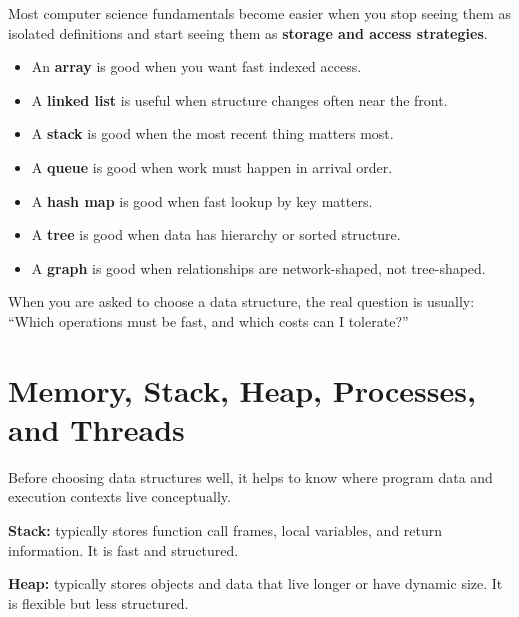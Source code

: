\documentclass[12pt, a4paper, oneside]{book}
\begin{document}
Most computer science fundamentals become easier when you stop seeing them as isolated definitions and start seeing them as \textbf{storage and access strategies}.

\begin{itemize}[leftmargin=2em]
    \item An \textbf{array} is good when you want fast indexed access.
    \item A \textbf{linked list} is useful when structure changes often near the front.
    \item A \textbf{stack} is good when the most recent thing matters most.
    \item A \textbf{queue} is good when work must happen in arrival order.
    \item A \textbf{hash map} is good when fast lookup by key matters.
    \item A \textbf{tree} is good when data has hierarchy or sorted structure.
    \item A \textbf{graph} is good when relationships are network-shaped, not tree-shaped.
\end{itemize}

\begin{intuitionbox}
When you are asked to choose a data structure, the real question is usually: ``Which operations must be fast, and which costs can I tolerate?''
\end{intuitionbox}

\section{Memory, Stack, Heap, Processes, and Threads}

Before choosing data structures well, it helps to know where program data and execution contexts live conceptually.

\textbf{Stack:} typically stores function call frames, local variables, and return information. It is fast and structured.

\textbf{Heap:} typically stores objects and data that live longer or have dynamic size. It is flexible but less structured.
\end{document}
